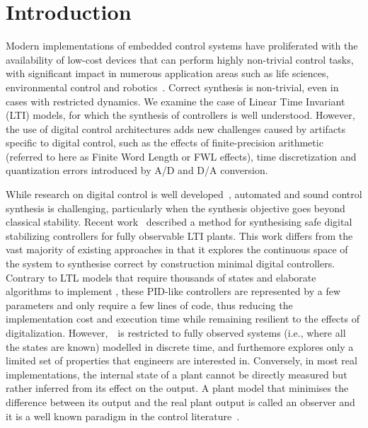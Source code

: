 \documentclass[sigconf]{llncs}
\begin{document}
\section{Introduction}

Modern implementations of embedded control systems have proliferated with
the availability of low-cost devices that can perform highly non-trivial
control tasks, with significant impact in numerous application areas such as
life sciences, environmental control and robotics~\cite{astrom1997computer,Franklin15}.  Correct synthesis is non-trivial, even in cases with
restricted dynamics.  We examine the case of Linear Time Invariant (LTI)
models, for which the synthesis of controllers is well understood.  However,
the use of digital control architectures adds new challenges caused by
artifacts specific to digital control, such as the effects of
finite-precision arithmetic (referred to here as Finite Word Length or FWL effects), time discretization and quantization errors
introduced by A/D and D/A conversion.

While research on digital control is well
developed~\cite{astrom1997computer}, automated and sound control synthesis
is challenging, particularly when the synthesis objective goes beyond
classical stability.  Recent work~\cite{abate2017automated} described a
method for synthesising safe digital stabilizing controllers for fully
observable LTI plants.  This work differs from the vast majority of existing
approaches in that it explores the continuous space of the system to
synthesise correct by construction minimal digital controllers.  Contrary to
LTL models that require thousands of states and elaborate algorithms to
implement \cite{reissig2017feedback}, these PID-like controllers are represented by a few parameters
and only require a few lines of code, thus reducing the implementation cost
and execution time while remaining resilient to the effects of digitalization.
However,~\cite{abate2017automated}~is restricted to fully observed
systems (i.e., where all the states are known) modelled in discrete time,
and furthemore explores only a limited set of properties that engineers
are interested in. Conversely, 
in most real implementations, the internal state of a plant cannot be
directly measured but rather inferred from its
effect on the output. A plant model that minimises the difference
between its output and the real plant output is called an observer and it is a well known
paradigm in the control literature~\cite{astrom1997computer}.
\end{document}
